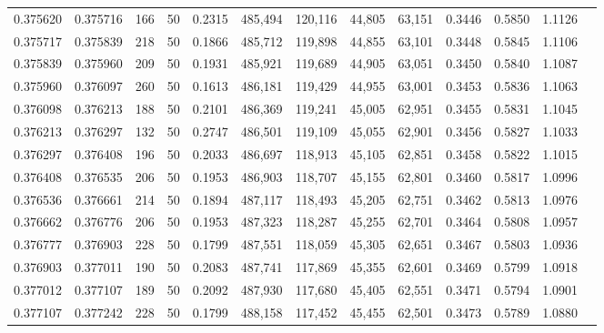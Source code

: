 \begin{tabular}{rrrrrrrrrrrrr}
0.375620 & 0.375716 &   166 &  50 &                                     0.2315 & 485,494 & 120,116 &  44,805 &  63,151 & 0.3446 & 0.5850 & 1.1126 \\
0.375717 & 0.375839 &   218 &  50 &                                     0.1866 & 485,712 & 119,898 &  44,855 &  63,101 & 0.3448 & 0.5845 & 1.1106 \\
0.375839 & 0.375960 &   209 &  50 &                                     0.1931 & 485,921 & 119,689 &  44,905 &  63,051 & 0.3450 & 0.5840 & 1.1087 \\
0.375960 & 0.376097 &   260 &  50 &                                     0.1613 & 486,181 & 119,429 &  44,955 &  63,001 & 0.3453 & 0.5836 & 1.1063 \\
0.376098 & 0.376213 &   188 &  50 &                                     0.2101 & 486,369 & 119,241 &  45,005 &  62,951 & 0.3455 & 0.5831 & 1.1045 \\
0.376213 & 0.376297 &   132 &  50 &                                     0.2747 & 486,501 & 119,109 &  45,055 &  62,901 & 0.3456 & 0.5827 & 1.1033 \\
0.376297 & 0.376408 &   196 &  50 &                                     0.2033 & 486,697 & 118,913 &  45,105 &  62,851 & 0.3458 & 0.5822 & 1.1015 \\
0.376408 & 0.376535 &   206 &  50 &                                     0.1953 & 486,903 & 118,707 &  45,155 &  62,801 & 0.3460 & 0.5817 & 1.0996 \\
0.376536 & 0.376661 &   214 &  50 &                                     0.1894 & 487,117 & 118,493 &  45,205 &  62,751 & 0.3462 & 0.5813 & 1.0976 \\
0.376662 & 0.376776 &   206 &  50 &                                     0.1953 & 487,323 & 118,287 &  45,255 &  62,701 & 0.3464 & 0.5808 & 1.0957 \\
0.376777 & 0.376903 &   228 &  50 &                                     0.1799 & 487,551 & 118,059 &  45,305 &  62,651 & 0.3467 & 0.5803 & 1.0936 \\
0.376903 & 0.377011 &   190 &  50 &                                     0.2083 & 487,741 & 117,869 &  45,355 &  62,601 & 0.3469 & 0.5799 & 1.0918 \\
0.377012 & 0.377107 &   189 &  50 &                                     0.2092 & 487,930 & 117,680 &  45,405 &  62,551 & 0.3471 & 0.5794 & 1.0901 \\
0.377107 & 0.377242 &   228 &  50 &                                     0.1799 & 488,158 & 117,452 &  45,455 &  62,501 & 0.3473 & 0.5789 & 1.0880 \\

\end{tabular}
